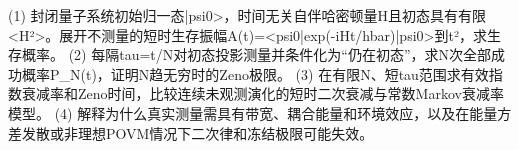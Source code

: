 (1) 封闭量子系统初始归一态|psi0>，时间无关自伴哈密顿量H且初态具有有限<H²>。展开不测量的短时生存振幅A(t)=<psi0|exp(-iHt/hbar)|psi0>到t²，求生存概率。
(2) 每隔tau=t/N对初态投影测量并条件化为“仍在初态”，求N次全部成功概率P_N(t)，证明N趋无穷时的Zeno极限。
(3) 在有限N、短tau范围求有效指数衰减率和Zeno时间，比较连续未观测演化的短时二次衰减与常数Markov衰减率模型。
(4) 解释为什么真实测量需具有带宽、耦合能量和环境效应，以及在能量方差发散或非理想POVM情况下二次律和冻结极限可能失效。
